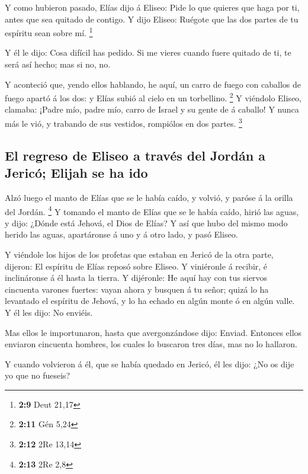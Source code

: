  Y como hubieron pasado, Elías dijo á Eliseo: Pide lo que
quieres que haga por ti, antes que sea quitado de contigo. Y dijo
Eliseo: Ruégote que las dos partes de tu espíritu sean sobre mí.
\footnote{\textbf{2:9} Deut 21,17}

 Y él le dijo: Cosa difícil has pedido. Si me vieres cuando
fuere quitado de ti, te será así hecho; mas si no, no.

 Y aconteció que, yendo ellos hablando, he aquí, un carro
de fuego con caballos de fuego apartó á los dos: y Elías subió al cielo
en un torbellino. \footnote{\textbf{2:11} Gén 5,24}  Y
viéndolo Eliseo, clamaba: ¡Padre mío, padre mío, carro de Israel y su
gente de á caballo! Y nunca más le vió, y trabando de sus vestidos,
rompiólos en dos partes. \footnote{\textbf{2:12} 2Re 13,14}

\hypertarget{el-regreso-de-eliseo-a-travuxe9s-del-jorduxe1n-a-jericuxf3-elijah-se-ha-ido}{%
\subsection{El regreso de Eliseo a través del Jordán a Jericó; Elijah se
ha
ido}\label{el-regreso-de-eliseo-a-travuxe9s-del-jorduxe1n-a-jericuxf3-elijah-se-ha-ido}}

 Alzó luego el manto de Elías que se le había caído, y
volvió, y paróse á la orilla del Jordán. \footnote{\textbf{2:13} 2Re 2,8}
 Y tomando el manto de Elías que se le había caído, hirió
las aguas, y dijo: ¿Dónde está Jehová, el Dios de Elías? Y así que hubo
del mismo modo herido las aguas, apartáronse á uno y á otro lado, y pasó
Eliseo.

 Y viéndole los hijos de los profetas que estaban en Jericó
de la otra parte, dijeron: El espíritu de Elías reposó sobre Eliseo. Y
viniéronle á recibir, é inclináronse á él hasta la tierra. 
Y dijéronle: He aquí hay con tus siervos cincuenta varones fuertes:
vayan ahora y busquen á tu señor; quizá lo ha levantado el espíritu de
Jehová, y lo ha echado en algún monte ó en algún valle. Y él les dijo:
No enviéis.

 Mas ellos le importunaron, hasta que avergonzándose dijo:
Enviad. Entonces ellos enviaron cincuenta hombres, los cuales lo
buscaron tres días, mas no lo hallaron.

 Y cuando volvieron á él, que se había quedado en Jericó,
él les dijo: ¿No os dije yo que no fueseis?

